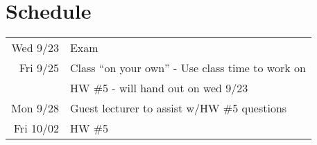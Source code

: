 \documentclass{article}
\begin{document}
\section*{Schedule}

\begin{tabular}{r|l}
Wed 9/23 & Exam \\
Fri 9/25 & Class ``on your own'' - Use class time to work on \\
         & HW \#5 - will hand out on wed 9/23 \\
Mon 9/28 & Guest lecturer to assist w/HW \#5 questions \\
Fri 10/02 & HW \#5 \\
\end{tabular}
\end{document}

